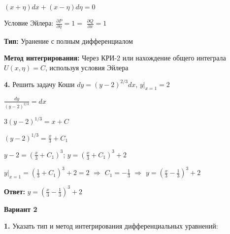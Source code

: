 \documentclass[a4paper]{article}
\begin{document}
$\displaystyle (x+\eta)dx+(x-\eta)d\eta=0$

\vspace{0.3cm}

Условие Эйлера: $\displaystyle \frac{\partial P}{\partial \eta} = 1  =$ $\displaystyle \frac{\partial Q}{\partial x} = 1$

\vspace{0.3cm}

\textbf{Тип: } Уранение с полным дифференциалом

\textbf{Метод интегрирования: } Через КРИ-2 или нахождение общего интеграла $U(x, \eta)=C$, используя условия Эйлера

\vspace{1cm}

\textbf{4.} Решить задачу Коши $\displaystyle dy=(y-2)^{2/3}dx$, $\displaystyle y|_{x=1}=2$

\vspace{0.3cm}

$\displaystyle \frac{dy}{(y-2)^{2/3}}=dx$

\vspace{0.3cm}

$\displaystyle 3(y-2)^{1/3}=x+C$

\vspace{0.3cm}

$\displaystyle (y-2)^{1/3}=\frac{x}{3}+C_1$

\vspace{0.3cm}

$\displaystyle y-2=(\frac{x}{3}+C_1)^3$; \hspace{0.7cm} $\displaystyle y=(\frac{x}{3}+C_1)^3+2$

\vspace{0.3cm}

$\displaystyle y|_{x=1}=(\frac{1}{3}+C_1)^3+2=2$ $\Rightarrow$ $C_1=-\frac{1}{3}$ $\Rightarrow$ $\displaystyle y=(\frac{x}{3}-\frac{1}{3})^3+2$

\vspace{0.3cm}

\textbf{Ответ: } $\displaystyle y=(\frac{x}{3}-\frac{1}{3})^3+2$

\vspace{2cm}

\begin{center}
  \textbf{Вариант 2}
\end{center}

\vspace{0.5cm}

\textbf{1.} Указать тип и метод интегрирования дифференциальных уравнений:
\end{document}
